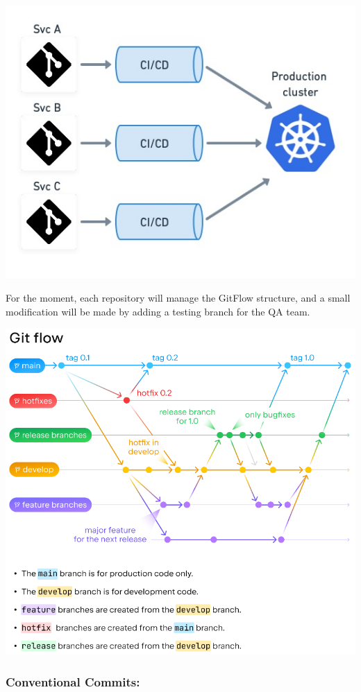 \documentclass{article}
\begin{document}
\includegraphics[width=\textwidth]{./assets/microdeployment.jpg}

For the moment, each repository will manage the GitFlow structure, and a
small modification will be made by adding a testing branch for the QA
team.

\includegraphics[width=\textwidth]{./assets/gitflow.png}

\hypertarget{conventionalcommits}{
\subsubsection{Conventional Commits:}\label{conventionalcommits}}
\end{document}
